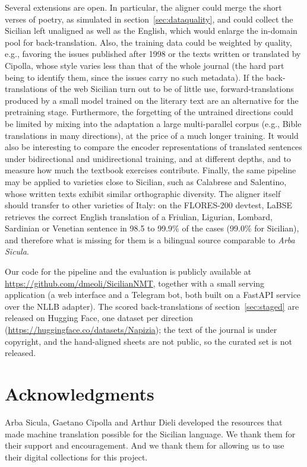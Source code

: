 \documentclass[11pt,a4paper]{article}
\begin{document}
Several extensions are open. In particular, the aligner could merge the short verses of poetry,
as simulated in section~\ref{sec:dataquality}, and could collect the Sicilian left unaligned
as well as the English, which would enlarge the in-domain pool for back-translation.
Also, the training data could be weighted by quality,
e.g., favoring the issues published after 1998 or the texts written or
translated by Cipolla, whose style varies less than that of the whole journal (the hard part
being to identify them, since the issues carry no such metadata). If the back-translations of
the web Sicilian turn out to be of little use, forward-translations produced by a small model
trained on the literary text are an alternative for the pretraining stage.
Furthermore, the forgetting of the untrained directions could be limited
by mixing into the adaptation a large multi-parallel corpus
(e.g., Bible translations in many directions), at the price of a much longer training. It would
also be interesting to compare the encoder representations of translated sentences under
bidirectional and unidirectional training, and at different depths, 
and to measure how much the textbook exercises contribute.
Finally, the same pipeline may be applied to varieties close to Sicilian,
such as Calabrese and Salentino, whose written texts exhibit similar orthographic diversity.
The aligner itself should transfer to other varieties of Italy: on the FLORES-200 devtest, LaBSE
retrieves the correct English translation of a Friulian, Ligurian, Lombard, Sardinian or Venetian
sentence in 98.5 to 99.9\% of the cases (99.0\% for Sicilian), and therefore what is missing for
them is a bilingual source comparable to \emph{Arba Sicula}.

Our code for the pipeline and the evaluation is publicly available at
\url{https://github.com/dmeoli/SicilianNMT}, together with a small
serving application (a web interface and a Telegram bot, both built on a FastAPI service over
the NLLB adapter). The scored back-translations of section~\ref{sec:staged} are released on
Hugging Face, one dataset per direction (\url{https://huggingface.co/datasets/Napizia}); the text
of the journal is under copyright, and the hand-aligned sheets are not public, so the curated set
is not released.



\section*{Acknowledgments}
Arba Sicula, Gaetano Cipolla and Arthur Dieli developed the resources that
made machine translation possible for the Sicilian language.
We thank them for their support and encouragement.
And we thank them for allowing us to use
their digital collections for this project.



\hypertarget{sec:references}{}


\end{document}
